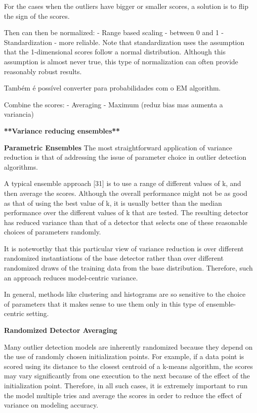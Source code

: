 For the cases when the outliers have bigger or smaller scores, a solution is to flip the sign of the scores.

Then can then be normalized:
- Range based scaling - between 0 and 1
- Standardization - more reliable. Note that standardization uses the assumption that the 1-dimensional scores follow a normal distribution. Although this assumption is almost never true, this type of normalization can often provide reasonably robust results.

Também é possível converter para probabilidades com o EM algorithm.

Combine the scores:
- Averaging
- Maximum (reduz bias mas aumenta a variancia)

\textbf{**Variance reducing ensembles**}

\textbf{Parametric Ensembles}
The most straightforward application of variance reduction is that of addressing the issue of parameter choice in outlier detection algorithms.

A typical ensemble approach [31] is to use a range of different values of k, and then average the scores. Although the overall performance might not be as good as that of using the best value of k, it is usually better than the median performance over the different values of k that are tested. The resulting detector has reduced variance than that of a detector that selects one of these reasonable choices of parameters randomly.

It is noteworthy that this particular view of variance reduction is over different randomized instantiations of the base detector rather than over different randomized draws of the training data from the base distribution. Therefore, such an approach reduces model-centric variance.

In general, methods like clustering and histograms are so sensitive to the choice of parameters that it makes sense to use them only in this type of ensemble-centric setting.

\textbf{Randomized Detector Averaging}

Many outlier detection models are inherently randomized because they depend on the use of randomly chosen initialization points. For example, if a data point is scored using its distance to the closest centroid of a k-means algorithm, the scores may vary significantly from one execution to the next because of the effect of the initialization point. Therefore, in all such cases, it is extremely important to run the model multiple tries and average the scores in order to reduce the effect of variance on modeling accuracy.

